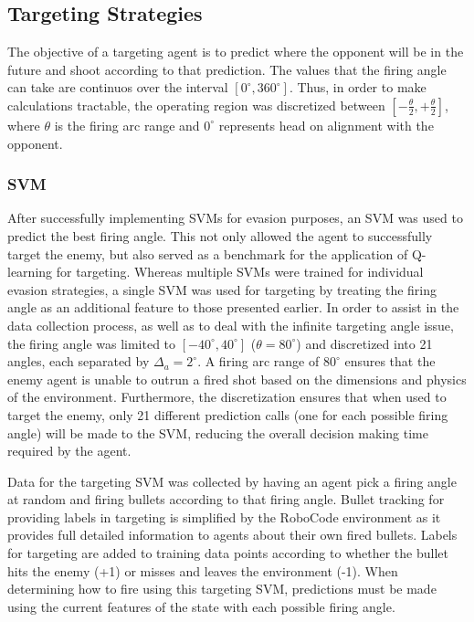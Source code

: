 \documentclass{article}
\theoremstyle{plain}
\theoremstyle{definition}
\theoremstyle{remark}
\begin{document}
\subsection*{Targeting Strategies}
The objective of a targeting agent is to predict where the opponent will be in the future and shoot according to that prediction. The values that the firing angle can take are continuos over the interval $[0^{\circ}, 360^{\circ}]$. Thus, in order to make calculations tractable, the operating region was discretized between $[-\frac{\theta}{2}, +\frac{\theta}{2}]$, where $\theta$ is the firing arc range and $0^{\circ}$ represents head on alignment with the opponent.

\subsubsection*{SVM}
After successfully implementing SVMs for evasion purposes, an SVM was used to predict the best firing angle. This not only allowed the agent to successfully target the enemy, but also served as a benchmark for the application of Q-learning for targeting. Whereas multiple SVMs were trained for individual evasion strategies, a single SVM was used for targeting by treating the firing angle as an additional feature to those presented earlier. In order to assist in the data collection process, as well as to deal with the infinite targeting angle issue, the firing angle was limited to $[-40^{\circ}, 40^{\circ}]$ ($\theta = 80^{\circ}$) and discretized into 21 angles, each separated by $\Delta_a = 2^{\circ}$. A firing arc range of $80^{\circ}$ ensures that the enemy agent is unable to outrun a fired shot based on the dimensions and physics of the environment. Furthermore, the discretization ensures that when used to target the enemy, only 21 different prediction calls (one for each possible firing angle) will be made to the SVM, reducing the overall decision making time required by the agent.

Data for the targeting SVM was collected by having an agent pick a firing angle at random and firing bullets according to that firing angle. Bullet tracking for providing labels in targeting is simplified by the RoboCode environment as it provides full detailed information to agents about their own fired bullets. Labels for targeting are added to training data points according to whether the bullet hits the enemy (+1) or misses and leaves the environment (-1). When determining how to fire using this targeting SVM, predictions must be made using the current features of the state with each possible firing angle. 
\end{document}
